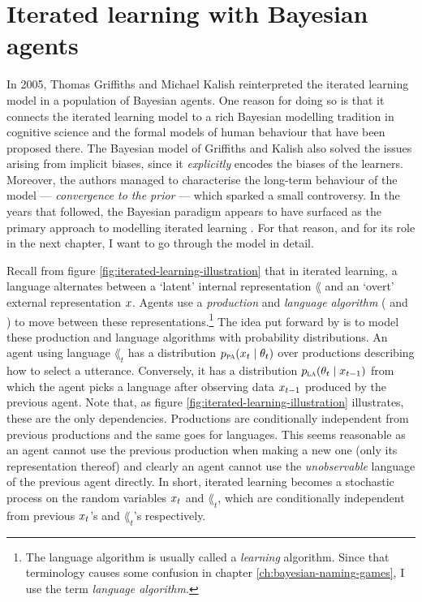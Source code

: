\documentclass{../src/bcthesispart}
\begin{document}
\section{Iterated learning with Bayesian agents}


In 2005, Thomas Griffiths and Michael Kalish reinterpreted the iterated learning model in a population of Bayesian agents\nocite{Griffiths2005,Griffiths2007}.
One reason for doing so is that it connects the iterated learning model to a rich Bayesian modelling tradition in cognitive science \parencite[see e.g.][]{Perfors2011,Goodman2016,Griffiths2008} and the formal models of human behaviour that have been proposed there.
The Bayesian model of Griffiths and Kalish also solved the issues arising from implicit biases, since it \emph{explicitly} encodes the biases of the learners.
Moreover, the authors managed to characterise the long-term behaviour of the model — \emph{convergence to the prior} — which sparked a small controversy.
In the years that followed, the Bayesian paradigm appears to have surfaced as the primary approach to modelling iterated learning \parencite{Kirby2014,Kirby2017}.
For that reason, and for its role in the next chapter, I want to go through the model in detail.




Recall from figure \ref{fig:iterated-learning-illustration} that in iterated learning, a language alternates between a ‘latent’ internal representation $\lang$ and an ‘overt’ external representation $x$.
Agents use a \emph{production} and \emph{language algorithm} (\PA{} and \LA{}) to move between these representations.\footnote{%
	The language algorithm is usually called a \emph{learning} algorithm.
	Since that terminology causes some confusion in chapter \ref{ch:bayesian-naming-games}, I use the term \emph{language algorithm}.
	}
The idea put forward by \textcite{Griffiths2007a} is to model these production and language algorithms with probability distributions.
An agent using language $\lang_t$ has a distribution $p_{\textsc{pa}}(x_t \mid \theta_t)$ over productions describing how to select a utterance. 
Conversely, it has a distribution $p_{\textsc{la}}(\theta_t \mid x_{t-1})$ from which the agent picks a language after observing data $x_{t-1}$ produced by the previous agent.
Note that, as figure \ref{fig:iterated-learning-illustration} illustrates, these are the only dependencies. 
Productions are conditionally independent from previous productions and the same goes for languages.
This seems reasonable as an agent cannot use the previous production when making a new one (only its representation thereof) and clearly an agent cannot use the \emph{unobservable} language of the previous agent directly.
In short, iterated learning becomes a stochastic process on the random variables $x_t$ and $\lang_t$, which are conditionally independent from previous $x_t$’s and $\lang_t$’s respectively.
\end{document}
